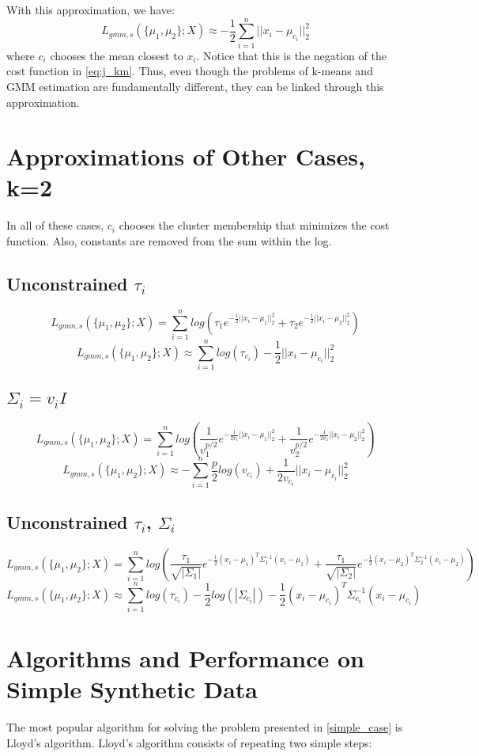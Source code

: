 \documentclass{article}
\begin{document}
\noindent With this approximation, we have:
\[ L_{gmm,s}(\{ \mu_1, \mu_2 \};X) \approx -\frac{1}{2}\sum\limits_{i=1}^n ||x_i-\mu_{c_i}||_2^2\]
where $c_i$ chooses the mean closest to $x_i$. Notice that this is the negation of the cost function in \eqref{eq:j_km}. Thus, even though the problems of k-means and GMM estimation are fundamentally different, they can be linked through this approximation.

\section{Approximations of Other Cases, k=2} \label{cases}
\quad
In all of these cases, $c_i$ chooses the cluster membership that minimizes the cost function. Also, constants are removed from the sum within the log.
\subsection{Unconstrained $\tau_i$}
\[L_{gmm,s}(\{ \mu_1, \mu_2 \};X)= \sum\limits_{i=1}^n log(\tau_1 e^{-\frac{1}{2}||x_i-\mu_1||_2^2}+ \tau_2 e^{-\frac{1}{2}||x_i-\mu_2||_2^2})\]
\[L_{gmm,s}(\{ \mu_1, \mu_2 \};X) \approx \sum\limits_{i=1}^n log(\tau_{c_i}) -\frac{1}{2}||x_i-\mu_{c_i}||_2^2\]

\subsection{$\Sigma_i = v_iI$ }
\[L_{gmm,s}(\{ \mu_1, \mu_2 \};X)= \sum\limits_{i=1}^n log(\frac{1}{v_1^{p/2}} e^{-\frac{1}{2v_1}||x_i-\mu_1||_2^2}+ \frac{1}{v_2^{p/2}} e^{-\frac{1}{2v_2}||x_i-\mu_2||_2^2})\]
\[L_{gmm,s}(\{ \mu_1, \mu_2 \};X) \approx - \sum\limits_{i=1}^n  \frac{p}{2}log(v_{c_i}) + \frac{1}{2v_{c_i}}||x_i-\mu_{c_i}||_2^2\]

\subsection{Unconstrained $\tau_i$, $\Sigma_i$}
\[L_{gmm,s}(\{ \mu_1, \mu_2 \};X)= \sum\limits_{i=1}^n log(\frac{\tau_1}{\sqrt{|\Sigma_1|}} e^{-\frac{1}{2}(x_i-\mu_1)^T\Sigma_1^{-1}(x_i-\mu_1)}+ \frac{\tau_1}{\sqrt{|\Sigma_2|}} e^{-\frac{1}{2}(x_i-\mu_2)^T\Sigma_2^{-1}(x_i-\mu_2)})\]
\[L_{gmm,s}(\{ \mu_1, \mu_2 \};X) \approx \sum\limits_{i=1}^n log(\tau_{c_i}) - \frac{1}{2}log(|\Sigma_{c_i}|) - \frac{1}{2}(x_i-\mu_{c_i})^T\Sigma_{c_i}^{-1}(x_i-\mu_{c_i})\]

\section{Algorithms and Performance on Simple Synthetic Data} \quad
The most popular algorithm for solving the problem presented in \ref{simple_case} is Lloyd's algorithm. Lloyd's algorithm consists of repeating two simple steps:
\end{document}
